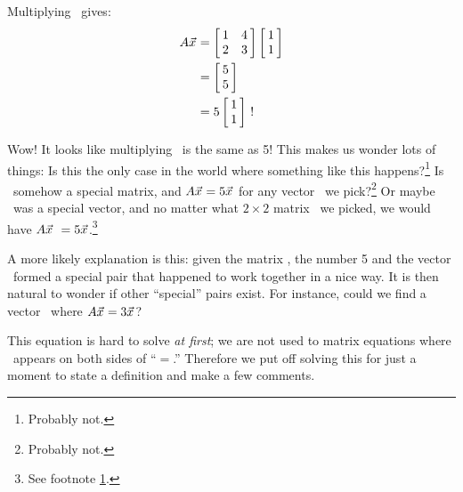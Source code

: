 Multiplying \tta\vx\ gives:
\begin{align*} \tta\vx &= \bmx{cc} 1&4\\2&3\emx \bmx{c}1\\1\emx\\
			&= \bmx{c}5\\5\emx\\ 
			&= 5\bmx{c}1\\1\emx \ !
\end{align*}

Wow! It looks like multiplying \tta\vx\ is the same as 5\vx! This makes us wonder lots of things: Is this the only case in the world where something like this happens?\footnote{Probably not.\label{note:prob_not}} Is \tta\ somehow a special matrix, and $A\vec{x_{}} = 5\vec{x_{}}$ for any vector \vx\ we pick?\footnote{Probably not.} Or maybe \vx\ was a special vector, and no matter what $2\times 2$ matrix \tta\ we picked, we would have $\tta\vx\ =5\vx$.\footnote{See footnote \ref{note:prob_not}.}

A more likely explanation is this: given the matrix \tta, the number 5 and the vector \vx\ formed a special pair that happened to work together in a nice way. It is then natural to wonder if other ``special'' pairs exist. For instance, could we find a vector \vx\ where $A\vec{x_{}}=3\vec{x_{}}$?

%
%

This equation is hard to solve \textit{at first}; we are not used to matrix equations where \vx\ appears on both sides of ``$=$.'' Therefore we put off solving this for just a moment to state a definition and make a few comments.

